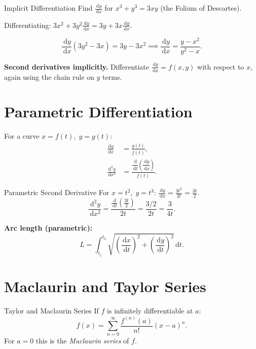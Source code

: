 \documentclass[12pt, a4paper]{book}
\newenvironment{keyresult}{%
  \begin{tcolorbox}[keystyle]%
}{%
  \end{tcolorbox}%
}
\newcommand{\dd}{\,\mathrm{d}}
\newcommand{\dx}{\,\mathrm{d}x}
\newcommand{\dt}{\,\mathrm{d}t}
\begin{document}
\begin{example}{Implicit Differentiation}{}
Find $\displaystyle \frac{\dd y}{\dx}$ for $\displaystyle x^3 + y^3 = 3xy$ (the Folium of Descartes).

Differentiating: $\displaystyle 3x^2 + 3y^2\frac{\dd y}{\dx} = 3y + 3x\frac{\dd y}{\dx}$.

\[
\frac{\dd y}{\dx}(3y^2-3x) = 3y-3x^2 \implies \frac{\dd y}{\dx}=\frac{y-x^2}{y^2-x}.
\]
\end{example}

\textbf{Second derivatives implicitly.} Differentiate $\displaystyle \frac{\dd y}{\dx}=f(x,y)$ with respect to $\displaystyle x$, again using the chain rule on $y$ terms.

\section{Parametric Differentiation}

For a curve $\displaystyle x=f(t),\;y=g(t)$:
\begin{align}
\frac{\dd y}{\dx} &= \frac{\dot{g}(t)}{\dot{f}(t)}, \label{eq:param1}\\
\frac{\dd^2 y}{\dx^2} &= \frac{\dfrac{\dd}{\dt}\!\left(\dfrac{\dd y}{\dx}\right)}{\dot{f}(t)}. \label{eq:param2}
\end{align}

\begin{example}{Parametric Second Derivative}{}
For $\displaystyle x=t^2,\;y=t^3$: $\frac{\dd y}{\dx}=\frac{3t^2}{2t}=\frac{3t}{2}$.
\[
\frac{\dd^2 y}{\dx^2}=\frac{\frac{\dd}{\dt}(\frac{3t}{2})}{2t}=\frac{3/2}{2t}=\frac{3}{4t}.
\]
\end{example}

\begin{keyresult}
\textbf{Arc length (parametric):}
\[
L = \int_{t_1}^{t_2}\sqrt{\left(\frac{\dx}{\dt}\right)^2+\left(\frac{\dd y}{\dt}\right)^2}\dt.
\]
\end{keyresult}

\section{Maclaurin and Taylor Series}

\begin{definition}{Taylor and Maclaurin Series}{}
If $\displaystyle f$ is infinitely differentiable at $a$:
\[
f(x) = \sum_{n=0}^{\infty}\frac{f^{(n)}(a)}{n!}(x-a)^n.
\]
For $\displaystyle a=0$ this is the \emph{Maclaurin series} of $f$.
\end{definition}
\end{document}
